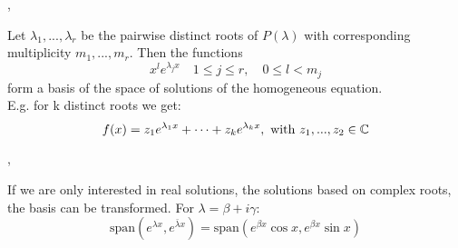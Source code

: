 \sep

\Theorem Let $\lambda_1, ..., \lambda_r$ be the pairwise distinct roots of $P(\lambda)$ with corresponding multiplicity $m_1, ..., m_r$.
Then the functions
$$x^{l}  e^{\lambda_j x} \quad 1 \leq j \leq r, \quad 0 \leq l < m_j$$
form a basis of the space of solutions of the homogeneous equation. \\
E.g. for k distinct roots we get:
$$ f(x) = z_1 e^{\lambda_1 x} + \cdots + z_k e^{\lambda_k x}, \text{ with }  z_1, ..., z_2 \in \mathbb{C} $$

\sep

\Remark If we are only interested in real solutions, the solutions based on complex roots, the basis can be transformed. For $\lambda=\beta + i\gamma$:
$$ \text{span}(e^{\lambda x}, e^{\bar{\lambda}x}) =
   \text{span}(e^{\beta x} \cos{x}, e^{\beta x} \sin{x})$$
   
